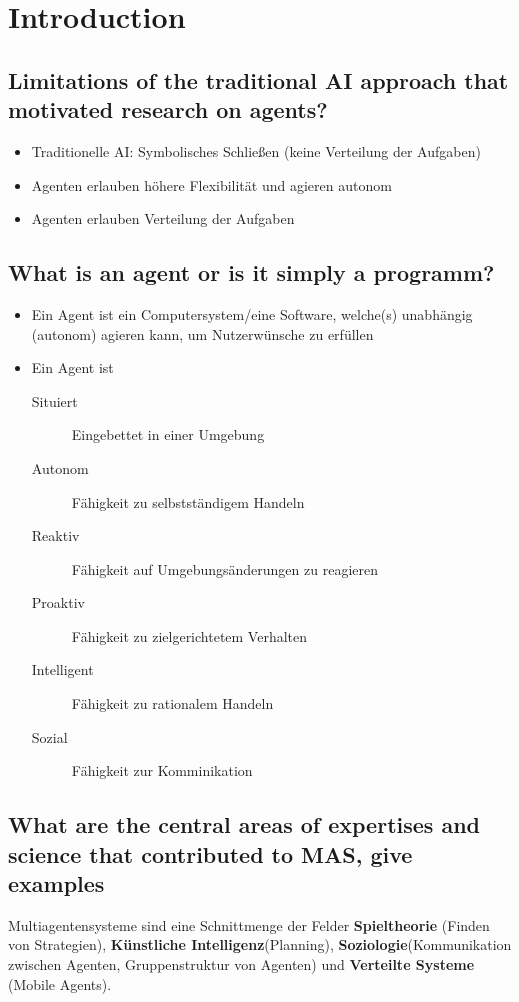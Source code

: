 \section{Introduction}
\subsection{Limitations of the traditional AI approach that motivated research on agents?}
\begin{itemize}
	\item Traditionelle AI: Symbolisches Schließen (keine Verteilung der Aufgaben)
	\item Agenten erlauben höhere Flexibilität und agieren autonom
	\item Agenten erlauben Verteilung der Aufgaben
\end{itemize}
\subsection{What is an agent or is it simply a programm?}
\label{subsec:agentvsprogram}
\begin{itemize}
	\item Ein Agent ist ein Computersystem/eine Software, welche(s) unabhängig (autonom) agieren kann, um Nutzerwünsche zu erfüllen
	\item Ein Agent ist \begin{description}
		\item[Situiert] Eingebettet in einer Umgebung
		\item[Autonom] Fähigkeit zu selbstständigem Handeln
		\item[Reaktiv] Fähigkeit auf Umgebungsänderungen zu reagieren
		\item[Proaktiv] Fähigkeit zu zielgerichtetem Verhalten
		\item[Intelligent] Fähigkeit zu rationalem Handeln
		\item[Sozial] Fähigkeit zur Komminikation
	\end{description}
\end{itemize}
\subsection{What are the central areas of expertises and science that contributed to MAS, give examples}
Multiagentensysteme sind eine Schnittmenge der Felder \textbf{Spieltheorie} (Finden von Strategien), \textbf{Künstliche Intelligenz}(Planning), \textbf{Soziologie}(Kommunikation zwischen Agenten, Gruppenstruktur von Agenten) und \textbf{Verteilte Systeme} (Mobile Agents).
